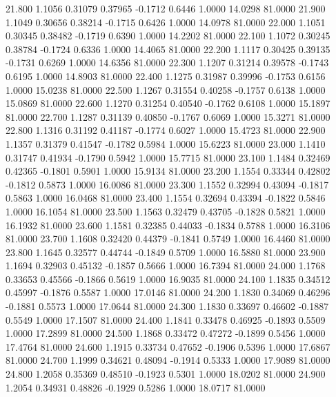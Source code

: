   21.800   1.1056   0.31079   0.37965  -0.1712   0.6446   1.0000  14.0298  81.0000
  21.900   1.1049   0.30656   0.38214  -0.1715   0.6426   1.0000  14.0978  81.0000
  22.000   1.1051   0.30345   0.38482  -0.1719   0.6390   1.0000  14.2202  81.0000
  22.100   1.1072   0.30245   0.38784  -0.1724   0.6336   1.0000  14.4065  81.0000
  22.200   1.1117   0.30425   0.39135  -0.1731   0.6269   1.0000  14.6356  81.0000
  22.300   1.1207   0.31214   0.39578  -0.1743   0.6195   1.0000  14.8903  81.0000
  22.400   1.1275   0.31987   0.39996  -0.1753   0.6156   1.0000  15.0238  81.0000
  22.500   1.1267   0.31554   0.40258  -0.1757   0.6138   1.0000  15.0869  81.0000
  22.600   1.1270   0.31254   0.40540  -0.1762   0.6108   1.0000  15.1897  81.0000
  22.700   1.1287   0.31139   0.40850  -0.1767   0.6069   1.0000  15.3271  81.0000
  22.800   1.1316   0.31192   0.41187  -0.1774   0.6027   1.0000  15.4723  81.0000
  22.900   1.1357   0.31379   0.41547  -0.1782   0.5984   1.0000  15.6223  81.0000
  23.000   1.1410   0.31747   0.41934  -0.1790   0.5942   1.0000  15.7715  81.0000
  23.100   1.1484   0.32469   0.42365  -0.1801   0.5901   1.0000  15.9134  81.0000
  23.200   1.1554   0.33344   0.42802  -0.1812   0.5873   1.0000  16.0086  81.0000
  23.300   1.1552   0.32994   0.43094  -0.1817   0.5863   1.0000  16.0468  81.0000
  23.400   1.1554   0.32694   0.43394  -0.1822   0.5846   1.0000  16.1054  81.0000
  23.500   1.1563   0.32479   0.43705  -0.1828   0.5821   1.0000  16.1932  81.0000
  23.600   1.1581   0.32385   0.44033  -0.1834   0.5788   1.0000  16.3106  81.0000
  23.700   1.1608   0.32420   0.44379  -0.1841   0.5749   1.0000  16.4460  81.0000
  23.800   1.1645   0.32577   0.44744  -0.1849   0.5709   1.0000  16.5880  81.0000
  23.900   1.1694   0.32903   0.45132  -0.1857   0.5666   1.0000  16.7394  81.0000
  24.000   1.1768   0.33653   0.45566  -0.1866   0.5619   1.0000  16.9035  81.0000
  24.100   1.1835   0.34512   0.45997  -0.1876   0.5587   1.0000  17.0146  81.0000
  24.200   1.1830   0.34069   0.46296  -0.1881   0.5573   1.0000  17.0644  81.0000
  24.300   1.1830   0.33697   0.46602  -0.1887   0.5549   1.0000  17.1507  81.0000
  24.400   1.1841   0.33478   0.46925  -0.1893   0.5509   1.0000  17.2899  81.0000
  24.500   1.1868   0.33472   0.47272  -0.1899   0.5456   1.0000  17.4764  81.0000
  24.600   1.1915   0.33734   0.47652  -0.1906   0.5396   1.0000  17.6867  81.0000
  24.700   1.1999   0.34621   0.48094  -0.1914   0.5333   1.0000  17.9089  81.0000
  24.800   1.2058   0.35369   0.48510  -0.1923   0.5301   1.0000  18.0202  81.0000
  24.900   1.2054   0.34931   0.48826  -0.1929   0.5286   1.0000  18.0717  81.0000
